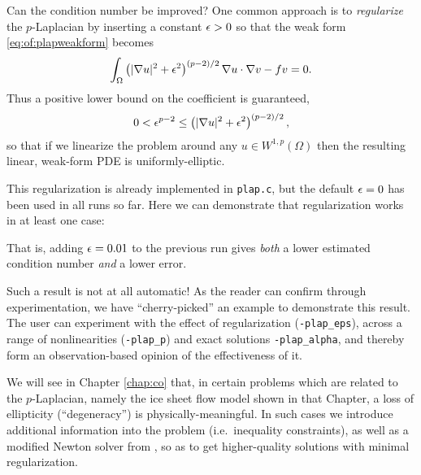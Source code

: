 Can the condition number be improved?  One common approach is to \emph{regularize} the $p$-Laplacian by inserting a constant $\epsilon>0$ so that the weak form \eqref{eq:of:plapweakform} becomes
\begin{equation}
\int_\Omega \left(|\nabla u|^2+\epsilon^2\right)^{(p-2)/2} \nabla u \cdot \nabla v - f v = 0. \label{eq:of:plapweakformreg}
\end{equation}
Thus a positive lower bound on the coefficient is guaranteed,
     $$0 < \epsilon^{p-2} \le \left(|\nabla u|^2+\epsilon^2\right)^{(p-2)/2},$$
so that if we linearize the problem around any $u\in W^{1,p}(\Omega)$ then the resulting linear, weak-form PDE is uniformly-elliptic.

This regularization is already implemented in \texttt{plap.c}, but the default $\eps=0$ has been used in all runs so far.  Here we can demonstrate that regularization works in at least one case:
That is, adding $$ to the previous run gives \emph{both} a lower estimated condition number \emph{and} a lower error.

Such a result is not at all automatic!  As the reader can confirm through experimentation,  we have ``cherry-picked'' an example to demonstrate this result.  The user can experiment with the effect of regularization (\texttt{-plap\_eps}), across a range of nonlinearities (\texttt{-plap\_p}) and exact solutions \texttt{-plap\_alpha}, and thereby form an observation-based opinion of the effectiveness of it. 

We will see in Chapter \ref{chap:co} that, in certain problems which are related to the $p$-Laplacian, namely the ice sheet flow model shown in that Chapter, a loss of ellipticity (``degeneracy'') is physically-meaningful.  In such cases we introduce additional information into the problem (i.e.~inequality constraints), as well as a modified Newton solver from \PETSc, so as to get higher-quality solutions with minimal regularization.


